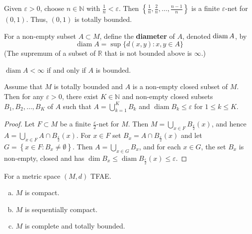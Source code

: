 \documentclass[a4paper,11pt]{article}
\begin{document}
\begin{example}
    Given $\varepsilon>0$, choose $n \in \mathbb{N}$ with $\frac{1}{n}<\varepsilon$. Then $\left\{\frac{1}{n}, \frac{2}{n}, \ldots, \frac{n-1}{n}\right\}$ is a finite $\varepsilon$-net for $(0,1)$. Thus, $(0,1)$ is totally bounded.
\end{example}

\begin{definition}
    For a non-empty subset $A \subset M$, define the \textbf{diameter} of $A$, denoted $\operatorname{diam} A$, by
$$
\operatorname{diam} A=\sup \{d(x, y): x, y \in A\}
$$
(The supremum of a subset of $\mathbb{R}$ that is not bounded above is $\infty$.)
\end{definition}

\begin{note}
    $\operatorname{diam} A<\infty$ if and only if $A$ is bounded.
\end{note}

\begin{lemma}\label{lma:totally bounded subset has small finite cover}
    Assume that $M$ is totally bounded and $A$ is a non-empty closed subset of $M$.
Then for any $\varepsilon>0$, there exist $K \in \mathbb{N}$ and non-empty closed subsets
$B_{1}, B_{2}, \ldots, B_{K}$ of $A$ such that $A=\bigcup_{k=1}^{K} B_{k}$ and $\operatorname{diam} B_{k} \leqslant \varepsilon$ for $1 \leqslant k \leqslant K$.
\end{lemma}

\begin{proof}
    Let $F \subset M$ be a finite $\frac{\varepsilon}{2}$-net for $M$. Then $M=\bigcup_{x \in F} B_{\frac{\varepsilon}{2}}(x)$, and hence
$A=\bigcup_{x \in F} A \cap B_{\frac{\varepsilon}{2}}(x)$. For $x \in F$ set $B_{x}=A \cap B_{\frac{\varepsilon}{2}}(x)$ and let
$G=\left\{x \in F: B_{x} \neq \emptyset\right\}$. Then $A=\bigcup_{x \in G} B_{x}$, and for each $x \in G$, the set $B_{x}$ is
non-empty, closed and has $\operatorname{dim} B_{x} \leqslant \operatorname{diam} B_{\frac{\varepsilon}{2}}(x) \leqslant \varepsilon$.
\end{proof}

\begin{theorem}\label{thm:metric space seqcompact tfae}
    For a metric space $(M, d)$ TFAE.
    \begin{enumerate}[(a)]
        \item $M$ is compact.

        \item $M$ is sequentially compact.
        
        \item $M$ is complete and totally bounded.
    \end{enumerate}
\end{theorem}
\end{document}
